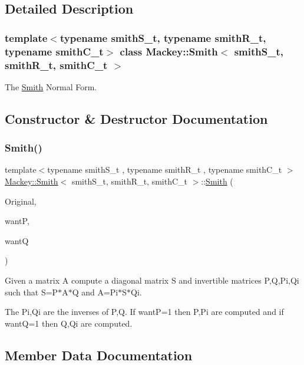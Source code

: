 \subsection{Detailed Description}
\subsubsection*{template$<$typename smith\+S\+\_\+t, typename smith\+R\+\_\+t, typename smith\+C\+\_\+t$>$\newline
class Mackey\+::\+Smith$<$ smith\+S\+\_\+t, smith\+R\+\_\+t, smith\+C\+\_\+t $>$}

The \hyperlink{classMackey_1_1Smith}{Smith} Normal Form. 

\subsection{Constructor \& Destructor Documentation}
\mbox{\label{classMackey_1_1Smith_a43f657bfa335acf5fe10dd864326c0aa}} 
\subsubsection{\texorpdfstring{Smith()}{Smith()}}
{\footnotesize\ttfamily template$<$typename smith\+S\+\_\+t , typename smith\+R\+\_\+t , typename smith\+C\+\_\+t $>$ \\
\hyperlink{classMackey_1_1Smith}{Mackey\+::\+Smith}$<$ smith\+S\+\_\+t, smith\+R\+\_\+t, smith\+C\+\_\+t $>$\+::\hyperlink{classMackey_1_1Smith}{Smith} (\begin{DoxyParamCaption}\item[{const smith\+S\+\_\+t \&}]{Original,  }\item[{const bool \&}]{wantP,  }\item[{const bool \&}]{wantQ }\end{DoxyParamCaption})}



Given a matrix A compute a diagonal matrix S and invertible matrices P,Q,Pi,Qi such that S=P$\ast$\+A$\ast$Q and A=Pi$\ast$\+S$\ast$\+Qi. 

The Pi,Qi are the inverses of P,Q. If wantP=1 then P,Pi are computed and if wantQ=1 then Q,Qi are computed. 

\subsection{Member Data Documentation}
\mbox{\label{classMackey_1_1Smith_a02ea735836a4a70f504e360495b0e1e1}} 
